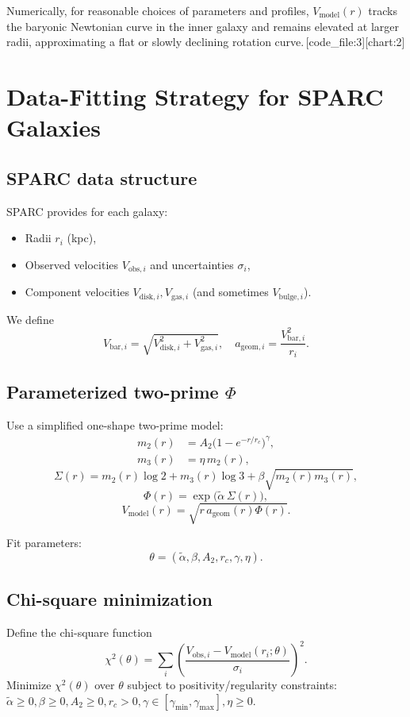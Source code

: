 \documentclass[11pt]{article}
\begin{document}
Numerically, for reasonable choices of parameters and profiles, \(V_{\mathrm{model}}(r)\) tracks the baryonic Newtonian curve in the inner galaxy and remains elevated at larger radii, approximating a flat or slowly declining rotation curve.\,[code_file:3][chart:2]

\section{Data-Fitting Strategy for SPARC Galaxies}

\subsection{SPARC data structure}

SPARC provides for each galaxy:
\begin{itemize}
\item Radii \(r_i\) (kpc),
\item Observed velocities \(V_{\mathrm{obs},i}\) and uncertainties \(\sigma_i\),
\item Component velocities \(V_{\mathrm{disk},i}, V_{\mathrm{gas},i}\) (and sometimes \(V_{\mathrm{bulge},i}\)).
\end{itemize}
We define
\[
V_{\mathrm{bar},i} = \sqrt{V_{\mathrm{disk},i}^2 + V_{\mathrm{gas},i}^2},
\quad a_{\mathrm{geom},i} = \frac{V_{\mathrm{bar},i}^2}{r_i}.
\]

\subsection{Parameterized two-prime \texorpdfstring{\(\Phi\)}{Phi}}

Use a simplified one-shape two-prime model:
\begin{align}
m_2(r) &= A_2\big(1 - e^{-r/r_c}\big)^\gamma,\\
m_3(r) &= \eta\, m_2(r),
\end{align}
\[
\Sigma(r) = m_2(r)\log 2 + m_3(r)\log 3 + \beta\sqrt{m_2(r)m_3(r)},
\]
\[
\Phi(r) = \exp\big(\tilde\alpha\,\Sigma(r)\big),
\]
\[
V_{\mathrm{model}}(r) = \sqrt{r\,a_{\mathrm{geom}}(r)\Phi(r)}.
\]

Fit parameters:
\[
\theta = (\tilde\alpha,\beta,A_2,r_c,\gamma,\eta).
\]

\subsection{Chi-square minimization}

Define the chi-square function
\[
\chi^2(\theta) = \sum_i \left(\frac{V_{\mathrm{obs},i} - V_{\mathrm{model}}(r_i;\theta)}{\sigma_i}\right)^2.
\]
Minimize \(\chi^2(\theta)\) over \(\theta\) subject to positivity/regularity constraints:
\(\tilde\alpha\ge0,\beta\ge0,A_2\ge 0,r_c>0,\gamma\in[\gamma_{\min},\gamma_{\max}],\eta\ge 0.\)
\end{document}
